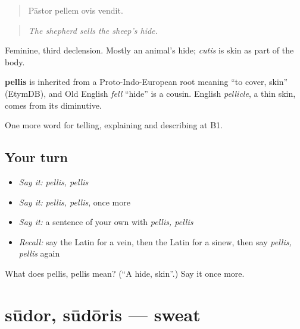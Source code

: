 \begin{quote}
Pāstor pellem ovis vendit.
\end{quote}

\begin{quote}
\emph{The shepherd sells the sheep's hide.}
\end{quote}

Feminine, third declension. Mostly an animal's hide; \emph{cutis} is skin as part of the body.

\begin{cousinweb}
\textbf{pellis} is inherited from a Proto-Indo-European root meaning \textquotedblleft{}to cover, skin\textquotedblright{} (EtymDB), and Old English \emph{fell} \textquotedblleft{}hide\textquotedblright{} is a cousin. English \emph{pellicle}, a thin skin, comes from its diminutive.
\end{cousinweb}

\begin{grammarlens}[title={What you've built}]
One more word for telling, explaining and describing at B1.
\end{grammarlens}

\subsection*{Your turn}
\begin{itemize}
\raggedright
  \item \emph{Say it:} \emph{pellis, pellis}
  \item \emph{Say it:} \emph{pellis, pellis}, once more
  \item \emph{Say it:} a sentence of your own with \emph{pellis, pellis}
  \item \emph{Recall:} say the Latin for a vein, then the Latin for a sinew, then say \emph{pellis, pellis} again
\end{itemize}

\begin{tcolorbox}[breakable,colback=teal!4,colframe=teal!35!black,title={Before you move on}]
What does pellis, pellis mean? (\textquotedblleft{}A hide, skin\textquotedblright{}.) Say it once more.
\end{tcolorbox}
\section[sūdor, sūdōris]{sūdor, sūdōris — sweat}

\label{lesson:LA-C517-sudor}




